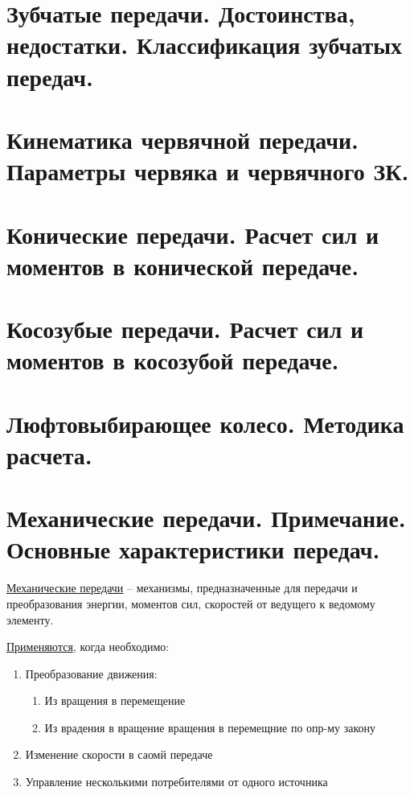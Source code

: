 \documentclass{article}
\begin{document}
\begin{multicols}{3}
\tiny
\section {\tiny Зубчатые передачи. Достоинства, недостатки. Классификация зубчатых передач.}

\section {\tiny Кинематика червячной передачи. Параметры червяка и червячного ЗК.}

\section {\tiny Конические передачи. Расчет сил и моментов в конической передаче.}

\section {\tiny Косозубые передачи. Расчет сил и моментов в косозубой передаче.}

\section {\tiny Люфтовыбирающее колесо. Методика расчета.}

\section {\tiny Механические передачи. Примечание. Основные характеристики передач.}

\underline{Механические передачи}  -- механизмы, предназначенные для передачи и преобразования 
энергии, моментов сил, скоростей от ведущего к ведомому элементу.

\underline{Применяются}, когда необходимо:
\begin{enumerate}
	\item Преобразование движения:
	\begin{enumerate}
		\item Из вращения в перемещение
		\item Из врадения в вращение
		 вращения в перемещние по опр-му закону
	\end{enumerate}
	\item Изменение скорости в саомй передаче
	\item Управление несколькими потребителями от одного источника
\end{enumerate}


\end{multicols}
\end{document}
